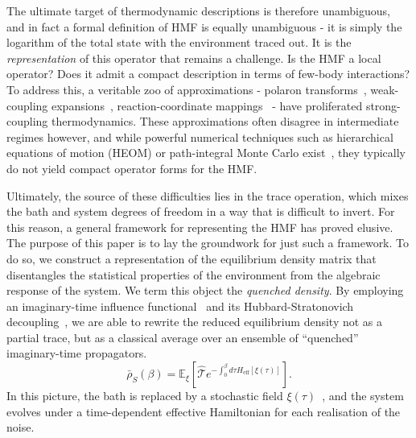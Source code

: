 The ultimate target of thermodynamic descriptions is therefore unambiguous, and in fact a formal definition of HMF is equally unambiguous - it is simply the logarithm of the total state with the environment traced out. It is the \emph{representation} of this operator that remains a challenge. Is the HMF a local operator? Does it admit a compact description in terms of few-body interactions? To address this, a veritable zoo of approximations - polaron transforms~\cite{jangNonequilibriumTheoryElectronic2008}, weak-coupling expansions~\cite{cresserWeakUltrastrongCoupling2021a}, reaction-coordinate mappings~\cite{duGeneralizedHamiltonianMeanforce2025a,nazirReactionCoordinateMapping2018} - have proliferated strong-coupling thermodynamics. These approximations often disagree in intermediate regimes however, and while powerful numerical techniques such as hierarchical equations of motion (HEOM) or path-integral Monte Carlo exist~\cite{moixEquilibriumreducedDensityMatrix2012,chenRigorousStochasticMatrix2014,makriExploitingClassicalDecoherence2014,tanimuraReducedHierarchicalEquations2014,songCalculationCorrelatedInitial2015}, they typically do not yield compact operator forms for the HMF.

Ultimately, the source of these difficulties lies in the trace operation, which mixes the bath and system degrees of freedom in a way that is difficult to invert. For this reason, a general framework for representing the HMF has proved elusive. The purpose of this paper is to lay the groundwork for just such a framework. To do so, we construct a representation of the equilibrium density matrix that disentangles the statistical properties of the environment from the algebraic response of the system. We term this object the \emph{quenched density}. By employing an imaginary-time influence functional~\cite{feynmanTheoryGeneralQuantum1963a,caldeiraQuantumTunnellingDissipative1983a,grabertQuantumBrownianMotion1988} and its Hubbard-Stratonovich decoupling~\cite{hubbardCalculationPartitionFunctions1959a,stratonovich1957QDistro,stockburgerExactNumberRepresentation2002}, we are able to rewrite the reduced equilibrium density not as a partial trace, but as a classical average over an ensemble of ``quenched'' imaginary-time propagators.
\begin{equation}
    \bar{\rho}_S(\beta) = \mathbb{E}_{\xi}\left[ \hat{\mathcal{T}} e^{-\int_0^\beta d\tau H_{\mathrm{eff}}[\xi(\tau)]} \right].
\end{equation}
In this picture, the bath is replaced by a stochastic field $\xi(\tau)$~\cite{stockburgerSimulatingSpinbosonDynamics2004,mccaulPartitionfreeApproachOpen2017c,wiedmannNonMarkovianDynamicsQuantum2020}, and the system evolves under a time-dependent effective Hamiltonian for each realisation of the noise.

